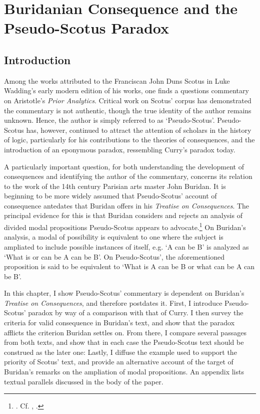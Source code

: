 \chapter[Buridan and Pseudo-Scotus]{Buridanian Consequence and the Pseudo-Scotus Paradox}
	\section{Introduction}
	Among the works attributed to the Franciscan John Duns Scotus in Luke Wadding's early modern edition of his works, one finds a questions commentary on Aristotle's \textit{Prior Analytics}. Critical work on Scotus' corpus has demonstrated the commentary is not authentic, though the true identity of the author remains unknown. Hence, the author is simply referred to as `Pseudo-Scotus'. Pseudo-Scotus has, however, continued to attract the attention of scholars in the history of logic, particularly for his contributions to the theories of consequences, and the introduction of an eponymous paradox, ressembling Curry's paradox today.
	
	A particularly important question, for both understanding the development of consequences and identifying the author of the commentary, concerns its relation to the work of the 14th century Parisian arts master John Buridan. It is beginning to be more widely assumed that Pseudo-Scotus' account of consequence antedates that Buridan offers in his \textit{Treatise on Consequences}. The principal evidence for this is that Buridan considers and rejects an analysis of divided modal propositions Pseudo-Scotus appears to advocate.\footnote{\cite[ch. 6]{Lagerlund2000} \cite[pp. 252-253]{Johnston2015}  \cite[pp. 4-5]{Read2015}. Cf. \cite[I, q. 26, pp. 143-144]{Pseudo-Scotus1891}, \cite[II. 4, p. 97]{Buridan2015}.} On Buridan's analysis, a modal of possibility is equivalent to one where the subject is ampliated to include possible instances of itself, e.g. `A can be B' is analyzed as `What is or can be A can be B'. On Pseudo-Scotus', the aforementioned proposition is said to be equivalent to `What is A can be B or what can be A can be B'.
	
	In this chapter, I show Pseudo-Scotus' commentary is dependent on Buridan's \textit{Treatise on Consequences}, and therefore postdates it. First, I introduce Pseudo-Scotus' paradox by way of a comparison with that of Curry. I then survey the criteria for valid consequence in Buridan's text, and show that the paradox afflicts the criterion Buridan settles on. From there, I compare several passages from both texts, and show that in each case the Pseudo-Scotus text should be construed as the later one: Lastly, I diffuse the example used to support the priority of Scotus' text, and provide an alternative account of the target of Buridan's remarks on the ampliation of modal propositions. An appendix lists textual parallels discussed in the body of the paper.
	
